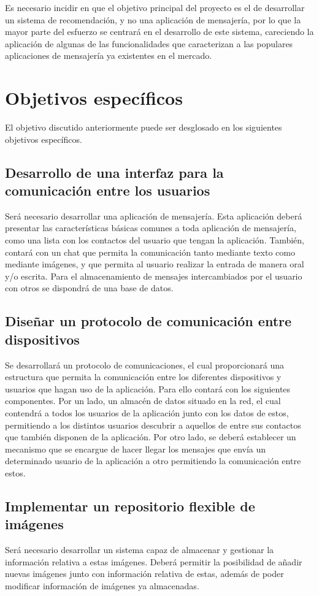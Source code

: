 Es necesario incidir en que el objetivo principal del proyecto es el de desarrollar un sistema de recomendación, y no una aplicación de mensajería, por lo que la mayor parte del esfuerzo se centrará en el desarrollo de este sistema, careciendo la aplicación de algunas de las funcionalidades que caracterizan a las populares aplicaciones de mensajería ya existentes en el mercado.


\section{Objetivos específicos}

El objetivo discutido anteriormente puede ser desglosado en los siguientes objetivos específicos.

\subsection{Desarrollo de una interfaz para la comunicación entre los usuarios}

Será necesario desarrollar una aplicación de mensajería. Esta aplicación deberá presentar las características básicas comunes a toda aplicación de mensajería, como una lista con los contactos del usuario que tengan la aplicación. También, contará con un chat que permita la comunicación tanto mediante texto como mediante imágenes, y que permita al usuario realizar la entrada de manera oral y/o escrita. Para el almacenamiento de mensajes intercambiados por el usuario con otros se dispondrá de una base de datos.

\subsection{Diseñar un protocolo de comunicación entre dispositivos}
Se desarrollará un protocolo de comunicaciones, el cual proporcionará una estructura que permita la comunicación entre los diferentes dispositivos y usuarios que hagan uso de la aplicación. Para ello contará con los siguientes componentes. Por un lado, un almacén de datos situado en la red, el cual contendrá a todos los usuarios de la aplicación junto con los datos de estos, permitiendo a los distintos usuarios descubrir a aquellos de entre sus contactos que también disponen de la aplicación. Por otro lado, se deberá establecer un mecanismo que se encargue de hacer llegar los mensajes que envía un determinado usuario de la aplicación a otro permitiendo la comunicación entre estos.  

\subsection{Implementar un repositorio flexible de imágenes}
Será necesario desarrollar un sistema capaz de almacenar y gestionar la información relativa a estas imágenes. Deberá permitir la posibilidad de añadir nuevas imágenes junto con información relativa de estas, además de poder modificar información de imágenes ya almacenadas.

